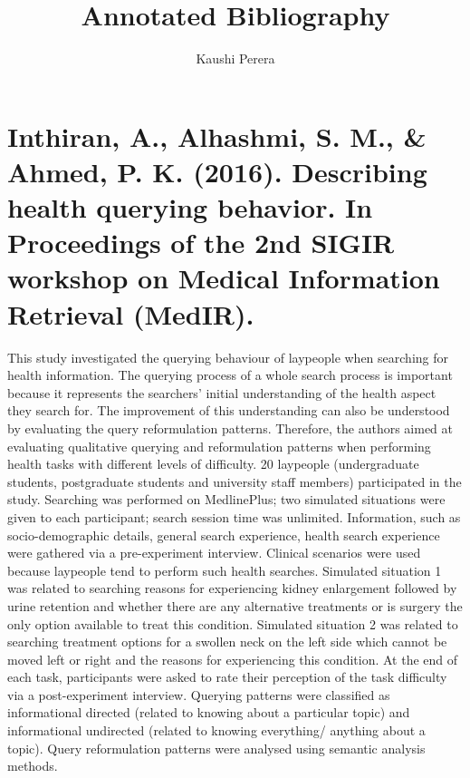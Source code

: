 \documentclass[]{article}
\title{Annotated Bibliography}
\author{Kaushi Perera}
\begin{document}
	
\maketitle
	
\section{Inthiran, A., Alhashmi, S. M., \& Ahmed, P. K. (2016). Describing health querying behavior. In Proceedings of the 2nd SIGIR workshop on Medical Information Retrieval (MedIR).} 

This study investigated the querying behaviour of laypeople when searching for health information. The querying process of a whole search process is important because it represents the searchers' initial understanding of the health aspect they search for. The improvement of this understanding can also be understood by evaluating the query reformulation patterns. Therefore, the authors aimed at evaluating qualitative querying and reformulation patterns when performing health tasks with different levels of difficulty. 20 laypeople (undergraduate students, postgraduate students and university staff members) participated in the study. Searching was performed on MedlinePlus; two simulated situations were given to each participant; search session time was unlimited. Information, such as socio-demographic details, general search experience, health search experience were gathered via a pre-experiment interview. Clinical scenarios were used because laypeople tend to perform such health searches. Simulated situation 1 was related to searching reasons for experiencing kidney enlargement followed by urine retention and whether there are any alternative treatments or is surgery the only option available to treat this condition. Simulated situation 2 was related to searching treatment options for a swollen neck on the left side which cannot be moved left or right and the reasons for experiencing this condition. At the end of each task, participants were asked to rate their perception of the task difficulty via a post-experiment interview. Querying patterns were classified as informational directed (related to knowing about a particular topic) and informational undirected (related to knowing everything/ anything about a topic). Query reformulation patterns were analysed using semantic analysis methods.
\end{document}
